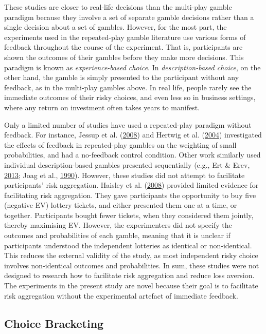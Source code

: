 \documentclass[
  english,
  man, donotrepeattitle,floatsintext]{apa7}
\theoremstyle{definition}
\theoremstyle{definition}
\theoremstyle{definition}
\theoremstyle{definition}
\theoremstyle{remark}
\begin{document}
These studies are closer to real-life decisions than the multi-play gamble
paradigm because they involve a set of separate gamble decisions rather than a
single decision about a set of gambles. However, for the most part, the
experiments used in the repeated-play gamble literature use various forms of
feedback throughout the course of the experiment. That is, participants are
shown the outcomes of their gambles before they make more decisions. This
paradigm is known as \emph{experience-based choice}. In \emph{description-based choice},
on the other hand, the gamble is simply presented to the participant without any
feedback, as in the multi-play gambles above. In real life, people rarely see
the immediate outcomes of their risky choices, and even less so in business
settings, where any return on investment often takes years to manifest.

Only a limited number of studies have used a repeated-play paradigm without
feedback. For instance, Jessup et al. (\protect\hyperlink{ref-jessup2008}{2008}) and Hertwig et al. (\protect\hyperlink{ref-hertwig2004}{2004}) investigated the effects of
feedback in repeated-play gambles on the weighting of small probabilities, and
had a no-feedback control condition. Other work similarly used individual
description-based gambles presented sequentially (e.g., Ert \& Erev, \protect\hyperlink{ref-ert2013}{2013}; Joag et al., \protect\hyperlink{ref-joag1990}{1990}).
However, these studies did not attempt to facilitate participants' risk
aggregation. Haisley et al. (\protect\hyperlink{ref-haisley2008}{2008}) provided limited evidence for facilitating risk
aggregation. They gave participants the opportunity to buy five (negative EV)
lottery tickets, and either presented them one at a time, or together.
Participants bought fewer tickets, when they considered them jointly, thereby
maximising EV. However, the experimenters did not specify the outcomes and
probabilities of each gamble, meaning that it is unclear if participants
understood the independent lotteries as identical or non-identical. This reduces
the external validity of the study, as most independent risky choice involves
non-identical outcomes and probabilities. In sum, these studies were not
designed to research how to facilitate risk aggregation and reduce loss
aversion. The experiments in the present study are novel because their goal is to
facilitate risk aggregation without the experimental artefact of immediate
feedback.

\hypertarget{choice-bracketing}{%
\subsection{Choice Bracketing}\label{choice-bracketing}}
\end{document}

